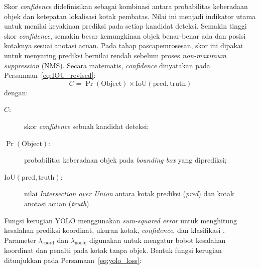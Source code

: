 Skor \textit{confidence} didefinisikan sebagai kombinasi antara probabilitas
keberadaan objek dan ketepatan lokalisasi kotak pembatas. Nilai ini menjadi
indikator utama untuk menilai keyakinan prediksi pada setiap kandidat deteksi.
Semakin tinggi skor \textit{confidence}, semakin besar kemungkinan objek
benar-benar ada dan posisi kotaknya sesuai anotasi acuan. Pada tahap
pascapemrosesan, skor ini dipakai untuk menyaring prediksi bernilai rendah
sebelum proses \textit{non-maximum suppression} (NMS). Secara matematis,
\textit{confidence} dinyatakan pada Persamaan~\ref{eq:IOU_revised}:
\begin{equation}
C = \Pr(\text{Object}) \times \text{IoU}(\text{pred}, \text{truth})
\label{eq:IOU_revised}
\end{equation}
\noindent dengan:
\begin{description}
  \item[$C$:] skor \textit{confidence} sebuah kandidat deteksi;
  \item[$\Pr(\text{Object})$:] probabilitas keberadaan objek pada \textit{bounding box} yang diprediksi;
  \item[$\text{IoU}(\text{pred}, \text{truth})$:] nilai \textit{Intersection over Union} antara kotak prediksi (\textit{pred}) dan kotak anotasi acuan (\textit{truth}).
\end{description}

Fungsi kerugian YOLO menggunakan \textit{sum-squared error} untuk
menghitung kesalahan prediksi koordinat, ukuran kotak,
\textit{confidence}, dan klasifikasi \cite{redmon2016you}. Parameter
$\lambda_{\text{coord}}$ dan $\lambda_{\text{noobj}}$ digunakan untuk
mengatur bobot kesalahan koordinat dan penalti pada kotak tanpa objek. Bentuk
fungsi kerugian ditunjukkan pada Persamaan~\ref{eq:yolo_loss}:

